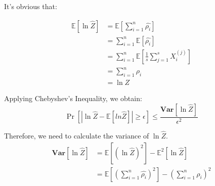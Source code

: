 \documentclass[a4paper, 12pt, titlepage]{article}
\begin{document}
It's obvious that:

\begin{equation}
    \begin{aligned}
        \mathbb E \left[ \ln{\hat{Z}}\right] &= \mathbb E \left[ \sum_{i = 1}^{n} \hat{\rho_{i}} \right] \\
                                             &= \sum_{i = 1}^{n} \mathbb E \left[ \hat{\rho_{i}} \right] \\
                                             &= \sum_{i = 1}^{n} \mathbb E \left[ \frac{1}{s} \sum_{j = 1}^{s} X_{i}^{(j)} \right] \\
                                             &= \sum_{i = 1}^{n} \rho_{i} \\
                                             &= \ln{Z}
    \end{aligned}
\end{equation}

Applying Chebyshev's Inequality, we obtain:
\[
    \Pr \left[ |\ln{\hat{Z}} - \mathbb E \left[ ln{\hat{Z}} \right] | \geq \epsilon \right] \leq \frac{\mathbf{Var} \left[ \ln{\hat{Z}}\right] }{\epsilon^{2}}
\]

Therefore, we need to calculate the variance of $\ln{\hat{Z}}$.
\begin{equation}
    \begin{aligned}
        \mathbf{Var} \left[ \ln{\hat{Z}} \right] &= \mathbb E \left[ \left( \ln{\hat{Z}} \right)^2 \right] - \mathbb E^2 \left[ \ln{\hat{Z}} \right]\\
                                                 &= \mathbb E \left[ \left( \sum_{i = 1}^{n} \hat{\rho_{i}} \right)^2 \right] - \left( \sum_{i = 1}^{n} \rho_{i} \right)^2 \\
    \end{aligned}
\end{equation}
\end{document}
